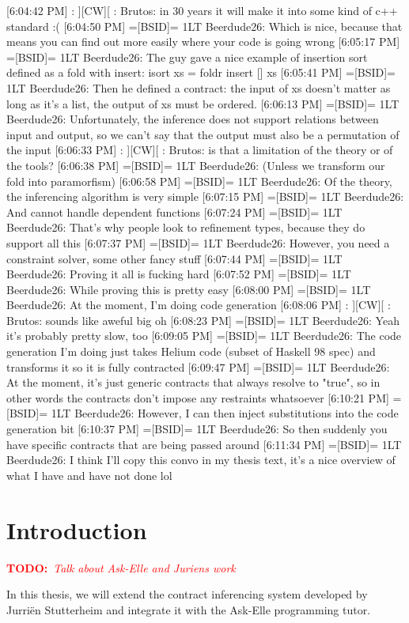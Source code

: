 \documentclass[10pt,a4paper]{article}
\newcommand{\annotate}[3]{
	\begin{scriptsize}
	\textcolor{#1}{\textbf{#2}~\textit{#3}}
	\end{scriptsize}\newline}
\newcommand{\todo}[1]{\annotate{red} {TODO:} {#1}}
\begin{document}
[6:04:42 PM] : ][CW][ : Brutos: in 30 years it will make it into some kind of c++ standard :(
[6:04:50 PM] =[BSID]= 1LT Beerdude26: Which is nice, because that means you can find out more easily where your code is going wrong
[6:05:17 PM] =[BSID]= 1LT Beerdude26: The guy gave a nice example of insertion sort defined as a fold with insert: isort xs = foldr insert [] xs
[6:05:41 PM] =[BSID]= 1LT Beerdude26: Then he defined a contract: the input of xs doesn't matter as long as it's a list, the output of xs must be ordered.
[6:06:13 PM] =[BSID]= 1LT Beerdude26: Unfortunately, the inference does not support relations between input and output, so we can't say that the output must also be a permutation of the input
[6:06:33 PM] : ][CW][ : Brutos: is that a limitation of the theory or of the tools?
[6:06:38 PM] =[BSID]= 1LT Beerdude26: (Unless we transform our fold into paramorfism)
[6:06:58 PM] =[BSID]= 1LT Beerdude26: Of the theory, the inferencing algorithm is very simple
[6:07:15 PM] =[BSID]= 1LT Beerdude26: And cannot handle dependent functions
[6:07:24 PM] =[BSID]= 1LT Beerdude26: That's why people look to refinement types, because they do support all this
[6:07:37 PM] =[BSID]= 1LT Beerdude26: However, you need a constraint solver, some other fancy stuff
[6:07:44 PM] =[BSID]= 1LT Beerdude26: Proving it all is fucking hard
[6:07:52 PM] =[BSID]= 1LT Beerdude26: While proving this is pretty easy
[6:08:00 PM] =[BSID]= 1LT Beerdude26: At the moment, I'm doing code generation
[6:08:06 PM] : ][CW][ : Brutos: sounds like aweful big oh
[6:08:23 PM] =[BSID]= 1LT Beerdude26: Yeah it's probably pretty slow, too
[6:09:05 PM] =[BSID]= 1LT Beerdude26: The code generation I'm doing just takes Helium code (subset of Haskell 98 spec) and transforms it so it is fully contracted
[6:09:47 PM] =[BSID]= 1LT Beerdude26: At the moment, it's just generic contracts that always resolve to "true", so in other words the contracts don't impose any restraints whatsoever
[6:10:21 PM] =[BSID]= 1LT Beerdude26: However, I can then inject substitutions into the code generation bit
[6:10:37 PM] =[BSID]= 1LT Beerdude26: So then suddenly you have specific contracts that are being passed around
[6:11:34 PM] =[BSID]= 1LT Beerdude26: I think I'll copy this convo in my thesis text, it's a nice overview of what I have and have not done lol

\tableofcontents

\section{Introduction}
\todo{Talk about Ask-Elle and Juriens work}
In this thesis, we will extend the contract inferencing system developed by Jurri\"en Stutterheim and integrate it with the Ask-Elle programming tutor.
\end{document}
